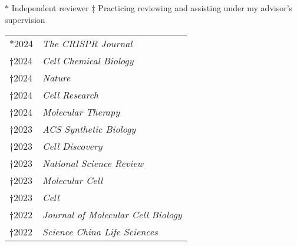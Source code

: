 






% 

\small
$*$ Independent reviewer \hspace{2em}  $\ddag$ Practicing reviewing and assisting under my advisor's supervision


\begin{longtable}[l]{@{}p{} p{}}
    $*$2024 & \textit{The CRISPR Journal} \\
    $\dagger$2024 & \textit{Cell Chemical Biology} \\
    $\dagger$2024 & \textit{Nature} \\
    $\dagger$2024 & \textit{Cell Research} \\
    $\dagger$2024 & \textit{Molecular Therapy} \\
    $\dagger$2023 & \textit{ACS Synthetic Biology} \\
    $\dagger$2023 & \textit{Cell Discovery} \\
    $\dagger$2023 & \textit{National Science Review} \\
    $\dagger$2023 & \textit{Molecular Cell} \\
    $\dagger$2023 & \textit{Cell} \\
    $\dagger$2022 & \textit{Journal of Molecular Cell Biology} \\
    $\dagger$2022 & \textit{Science China Life Sciences} \\
\end{longtable}

